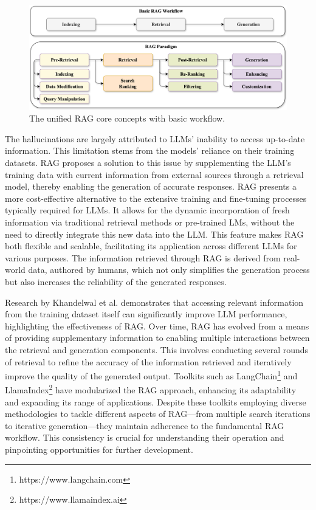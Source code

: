 \begin{figure}
	\includegraphics[width=\textwidth]{Figures/RAG_paradigm.png}
	\caption{The unified RAG core concepts with basic workflow.}
	\label{fig:rag_paradigm}
\end{figure}

The hallucinations are largely attributed to LLMs' inability to access up-to-date information. This limitation stems from the models' reliance on their training datasets. RAG proposes a solution to this issue by supplementing the LLM's training data with current information from external sources through a retrieval model, thereby enabling the generation of accurate responses. RAG presents a more cost-effective alternative to the extensive training and fine-tuning processes typically required for LLMs. It allows for the dynamic incorporation of fresh information via traditional retrieval methods or pre-trained LMs, without the need to directly integrate this new data into the LLM. This feature makes RAG both flexible and scalable, facilitating its application across different LLMs for various purposes. The information retrieved through RAG is derived from real-world data, authored by humans, which not only simplifies the generation process but also increases the reliability of the generated responses. 

Research by Khandelwal et al. \cite{khandelwal2020generalization} demonstrates that accessing relevant information from the training dataset itself can significantly improve LLM performance, highlighting the effectiveness of RAG. Over time, RAG has evolved from a means of providing supplementary information to enabling multiple interactions between the retrieval and generation components. This involves conducting several rounds of retrieval to refine the accuracy of the information retrieved and iteratively improve the quality of the generated output. Toolkits such as LangChain\footnote{https://www.langchain.com} and LlamaIndex\footnote{https://www.llamaindex.ai} have modularized the RAG approach, enhancing its adaptability and expanding its range of applications. Despite these toolkits employing diverse methodologies to tackle different aspects of RAG—from multiple search iterations to iterative generation—they maintain adherence to the fundamental RAG workflow. This consistency is crucial for understanding their operation and pinpointing opportunities for further development.

